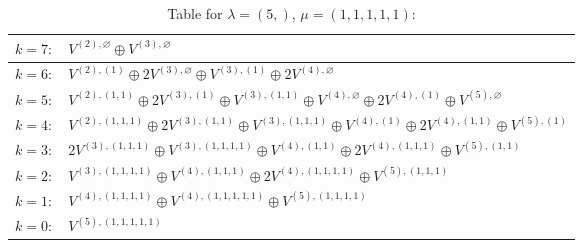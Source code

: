 \documentclass[a4paper,12pt]{article}
\begin{document}
\renewcommand{\arraystretch}{1.6} 
\begin{table}[H]
\centering
\caption{Table for $\lambda = (5,)$, $\mu = (1, 1, 1, 1, 1)$:}
\begin{tabular}{|>{\centering\arraybackslash}p{15cm}|}
\hline
 $k = 7: \quad V^{(2), \varnothing} \oplus V^{(3), \varnothing} $ \\ \hline
 $k = 6: \quad V^{(2), (1)} \oplus 2 V^{(3), \varnothing} \oplus V^{(3), (1)} \oplus 2 V^{(4), \varnothing} $ \\ \hline
 $k = 5: \quad V^{(2), (1, 1)} \oplus 2 V^{(3), (1)} \oplus V^{(3), (1, 1)} \oplus V^{(4), \varnothing} \oplus 2 V^{(4), (1)} \oplus V^{(5), \varnothing} $ \\ \hline
 $k = 4: \quad V^{(2), (1, 1, 1)} \oplus 2 V^{(3), (1, 1)} \oplus V^{(3), (1, 1, 1)} \oplus V^{(4), (1)} \oplus 2 V^{(4), (1, 1)} \oplus V^{(5), (1)} $ \\ \hline
 $k = 3: \quad 2 V^{(3), (1, 1, 1)} \oplus V^{(3), (1, 1, 1, 1)} \oplus V^{(4), (1, 1)} \oplus 2 V^{(4), (1, 1, 1)} \oplus V^{(5), (1, 1)} $ \\ \hline
 $k = 2: \quad V^{(3), (1, 1, 1, 1)} \oplus V^{(4), (1, 1, 1)} \oplus 2 V^{(4), (1, 1, 1, 1)} \oplus V^{(5), (1, 1, 1)} $ \\ \hline
 $k = 1: \quad V^{(4), (1, 1, 1, 1)} \oplus V^{(4), (1, 1, 1, 1, 1)} \oplus V^{(5), (1, 1, 1, 1)} $ \\ \hline
 $k = 0: \quad V^{(5), (1, 1, 1, 1, 1)} $ \\ \hline
\end{tabular}
\end{table}
\end{document}

